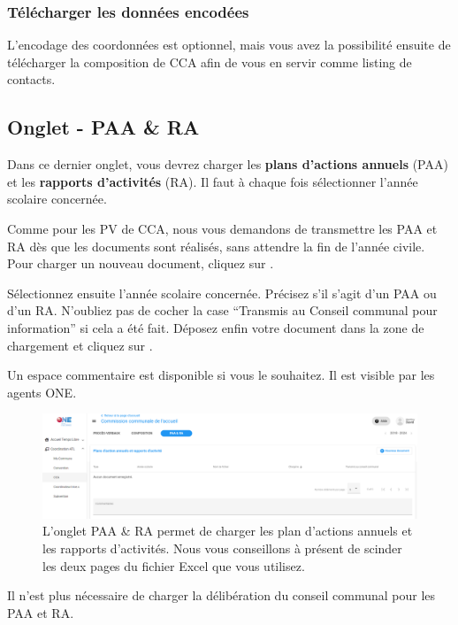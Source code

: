 \subsubsection{Télécharger les données encodées}
L’encodage des coordonnées est optionnel, mais vous avez la possibilité ensuite de télécharger la composition de CCA afin de vous en servir comme listing de contacts.


\subsection{Onglet - PAA \& RA}
Dans ce dernier onglet, vous devrez charger les \textbf{plans d’actions annuels} (PAA) et les \textbf{rapports d’activités} (RA). Il faut à chaque fois sélectionner l’année scolaire concernée. 

Comme pour les PV de CCA, nous vous demandons de transmettre les PAA et RA dès que les documents sont réalisés, sans attendre la fin de l’année civile. Pour charger un nouveau document, cliquez sur . 

Sélectionnez ensuite l’année scolaire concernée. Précisez s’il s’agit d’un PAA ou d’un RA. N’oubliez pas de cocher la case “Transmis au Conseil communal pour information” si cela a été fait. Déposez enfin votre document dans la zone de chargement et cliquez sur . 

Un espace commentaire est disponible si vous le souhaitez. Il est visible par les agents ONE. 

\begin{figure}[htbp]
    \centering
    \includegraphics[width=12cm,frame]{Images/catl/cca-paa-ra.png}
    \caption{L'onglet PAA \& RA permet de charger les plan d'actions annuels et les rapports d'activités. Nous vous conseillons à présent de scinder les deux pages du fichier Excel que vous utilisez.}
    \label{fig:cca-paa-ra}
\end{figure}


\begin{information}
Il n’est plus nécessaire de charger la délibération du conseil communal pour les PAA et RA.
\end{information}

